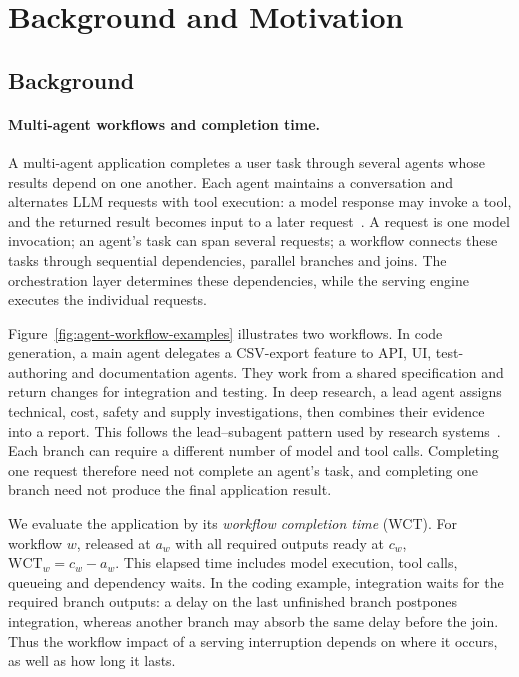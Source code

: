 \section{Background and Motivation}
\label{sec:background-motivation}

\subsection{Background}
\label{sec:motivation-background}

\paragraph{Multi-agent workflows and completion time.}
A multi-agent application completes a user task through several agents
whose results depend on one another. Each agent maintains a conversation
and alternates LLM requests with tool execution: a model response may
invoke a tool, and the returned result becomes input to a later
request~\cite{wu2023autogen}. A request is one model invocation; an
agent's task can span several requests; a workflow connects these tasks
through sequential dependencies, parallel branches and joins.
The orchestration layer determines these dependencies, while the serving
engine executes the individual requests.

Figure~\ref{fig:agent-workflow-examples} illustrates two workflows.
In code generation, a main agent delegates a CSV-export feature to API,
UI, test-authoring and documentation agents. They work from a shared
specification and return changes for integration and testing.
In deep research, a lead agent assigns technical, cost, safety and supply
investigations, then combines their evidence into a report. This follows
the lead--subagent pattern used by research
systems~\cite{anthropic2025multiagent}. Each branch can require a different
number of model and tool calls. Completing one request therefore need
not complete an agent's task, and completing one branch need not produce
the final application result.

We evaluate the application by its \emph{workflow completion time}
(WCT). For workflow $w$, released at $a_w$ with all required outputs
ready at $c_w$, $\mathrm{WCT}_w=c_w-a_w$. This elapsed time includes
model execution, tool calls, queueing and dependency waits.
In the coding example, integration waits for the required branch outputs:
a delay on the last unfinished branch postpones integration, whereas
another branch may absorb the same delay before the join. Thus the
workflow impact of a serving interruption depends on where it occurs,
as well as how long it lasts.

